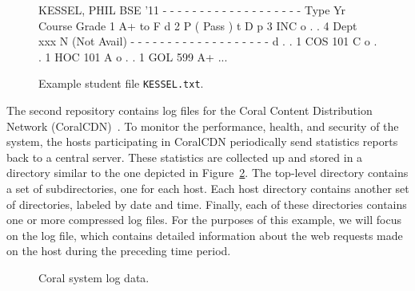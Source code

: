 \begin{figure}
\begin{code}
KESSEL, PHIL	   BSE   '11
- - - - - - - - - - - - - - - - - - -
Type    Yr  Course     Grade
         1             A+ to F
d        2             P  (  Pass )
t  D  p  3             INC
o  .  .  4  Dept  xxx  N  (Not Avail)
- - - - - - - - - - - - - - - - - - -
d  .  .  1  COS   101  C
o  .  .  1  HOC   101  A
o  .  .  1  GOL   599  A+
...
\end{code}
\caption{Example student file {\tt KESSEL.txt}.}
\label{fig:student-file-example}
\end{figure}

The second repository contains log files for the Coral Content
Distribution Network
(CoralCDN)~\cite{freedman+:coral,freedman:coral-experience}. To
monitor the performance, health, and security of the system, the hosts
participating in CoralCDN periodically send statistics reports back to
a central server. These statistics are collected up and stored in a
directory similar to the one depicted in Figure~\ref{fig:coral-pic}.
The top-level  directory contains a set of subdirectories, one
for each host. Each host directory contains another set of
directories, labeled by date and time. Finally, each of these
directories contains one or more compressed log files. For the
purposes of this example, we will focus on the 
log file, which contains detailed information about the web requests
made on the host during the preceding time period.


\begin{figure}
\caption{Coral system log data.}
\label{fig:coral-pic}
\end{figure}


